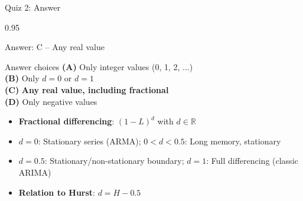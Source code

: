 \documentclass[9pt, aspectratio=169, t]{beamer}
\begin{document}
\begin{frame}{Quiz 2: Answer}
    \begin{cminipage}{0.95\textwidth}
    {\small
    \begin{exampleblock}{Answer: C -- Any real value}
    \begin{block}{Answer choices}
        \textcolor{MainBlue}{\textbf{(A)}} Only integer values (0, 1, 2, ...) \incorrect\\[2pt]
        \textcolor{MainBlue}{\textbf{(B)}} Only $d = 0$ or $d = 1$ \incorrect\\[2pt]
        \textcolor{MainBlue}{\textbf{(C)}} \textbf{\textcolor{Forest}{Any real value, including fractional}} \correct\\[2pt]
        \textcolor{MainBlue}{\textbf{(D)}} Only negative values \incorrect
    \end{block}

        \vspace{0.1cm}

        \begin{itemize}\setlength{\itemsep}{0pt}
            \item \textbf{Fractional differencing}: $(1-L)^d$ with $d \in \mathbb{R}$
            \item $d = 0$: Stationary series (ARMA); $0 < d < 0.5$: Long memory, stationary
            \item $d = 0.5$: Stationary/non-stationary boundary; $d = 1$: Full differencing (classic ARIMA)
            \item \textbf{Relation to Hurst}: $d = H - 0.5$
        \end{itemize}
    \end{exampleblock}
    }
    \end{cminipage}
\end{frame}
\end{document}
